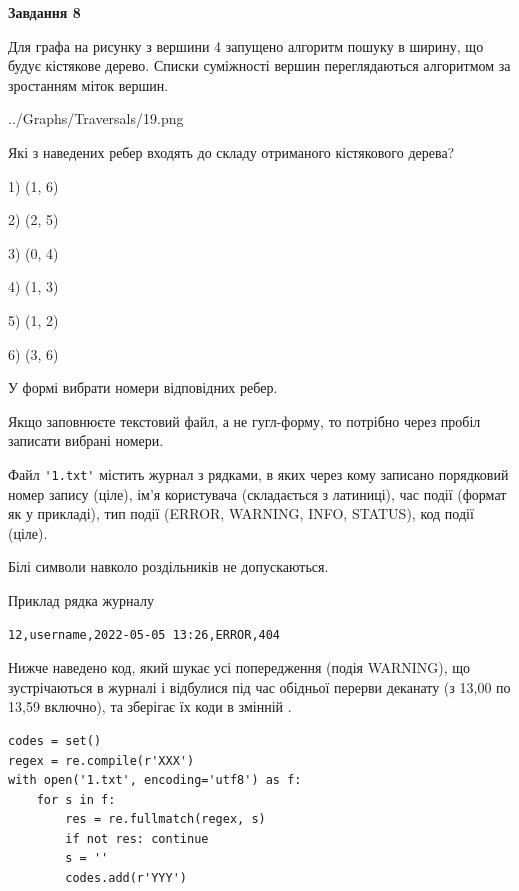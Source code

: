 \documentclass[12pt, ukrainian]{article}
\def\code#1{\Verb!#1!}
\begin{document}
{\begin {large}
{\begin {center}\textbf{Завдання 8}\end {center}}\par
Для графа на рисунку з вершини 4 запущено алгоритм пошуку в ширину, що будує кістякове дерево. Списки суміжності вершин переглядаються алгоритмом за зростанням міток вершин.\par
\begin{center}
	{../Graphs/Traversals/19.png}
\end{center}
\par Які з наведених ребер входять до складу отриманого кістякового дерева?\par
1) (1, 6)\par
2) (2, 5)\par
3) (0, 4)\par
4) (1, 3)\par
5) (1, 2)\par
6) (3, 6)\par
{\vskip 15pt} У формі вибрати номери відповідних ребер.


Якщо заповнюєте текстовий файл, а не гугл-форму, то потрібно через пробіл записа\-ти вибрані номери.\par
\newpage


Файл \code{'1.txt'} містить журнал з рядками, в яких через кому записано поряд\-ко\-вий номер запису (ціле), ім'я користувача (складається з латиниці), час події (фор\-мат як у прикладі), тип події (ERROR, WARNING, INFO, STATUS), код події (ціле).

Білі символи навколо роздільників не допускаються.

Приклад рядка журналу



\begin{verbatim}
12,username,2022-05-05 13:26,ERROR,404
\end{verbatim}


Нижче наведено код, який шукає усі попередження (подія WARNING), що зустрі\-ча\-ються в журналі і відбулися під час обідньої перерви деканату (з 13,00 по 13,59 включно), та зберігає їх коди в змінній .



\begin{verbatim}
codes = set()
regex = re.compile(r'XXX')
with open('1.txt', encoding='utf8') as f:
    for s in f:
        res = re.fullmatch(regex, s)
        if not res: continue
        s = ''
        codes.add(r'YYY')
\end{verbatim}





\end{large}}
\end{document}

